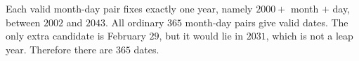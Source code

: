 Each valid month-day pair fixes exactly one year, namely $2000+$ month $+$ day, between $2002$ and $2043$. All ordinary $365$ month-day pairs give valid dates. The only extra candidate is February $29$, but it would lie in $2031$, which is not a leap year. Therefore there are $\boxed{365}$ dates.
